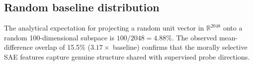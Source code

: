 \subsection{Random baseline distribution}

The analytical expectation for projecting a random unit vector in $\mathbb{R}^{2048}$ onto a random 100-dimensional subspace is $100/2048 = 4.88\%$.
The observed mean-difference overlap of 15.5\% ($3.17\times$ baseline) confirms that the morally selective SAE features capture genuine structure shared with supervised probe directions.

